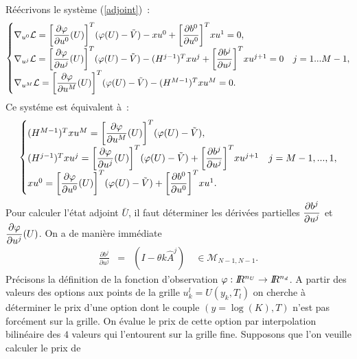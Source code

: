 R\'e\'ecrivons le syst\`eme (\ref{adjoint})~:
\begin{equation*}
\begin{cases}
\nabla_{u^0}\mathcal{L} = \biggl[{\displaystyle\frac{\partial \varphi}
{\partial u^0}(U)}\biggr]^T(\varphi(U)-\tilde{V}) - x{u}^0 + 
\biggl[{\displaystyle\frac{\partial b^0}{\partial u^0}}\biggr]^Tx{u}^1 
= 0,\\
\nabla_{u^j}\mathcal{L} = \biggl[{\displaystyle\frac{\partial \varphi}
{\partial u^j}(U)}\biggr]^T(\varphi(U)-\tilde{V}) - 
(H^{j-1})^Tx{u}^j + \biggl[{\displaystyle\frac{\partial b^j}
{\partial u^j}}\biggr]^Tx{u}^{j+1} = 0 & j=1...M-1,\\
\nabla_{u^M}\mathcal{L} = \biggl[{\displaystyle\frac{\partial \varphi}
{\partial u^M}(U)}\biggr]^T(\varphi(U)-\tilde{V}) - 
(H^{M-1})^Tx{u}^M = 0.
\end{cases}
\end{equation*}
Ce syst\'eme est \'equivalent \`a~: 
\begin{equation}
\begin{cases}
(H^{M-1})^Tx{u}^M = \biggl[{\displaystyle\frac{\partial \varphi}
{\partial u^M}(U)}\biggr]^T(\varphi(U)-\tilde{V}),\\
(H^{j-1})^Tx{u}^j = \biggl[{\displaystyle\frac{\partial \varphi}
{\partial u^j}(U)}\biggr]^T(\varphi(U)-\tilde{V}) + 
\biggl[{\displaystyle\frac{\partial b^j}{\partial u^j}}\biggr]^T
x{u}^{j+1} & j=M-1,...,1,\\
x{u}^0 = \biggl[{\displaystyle\frac{\partial \varphi}
{\partial u^0}(U)}\biggr]^T(\varphi(U)-\tilde{V}) + 
\biggl[{\displaystyle\frac{\partial b^0}{\partial u^0}}\biggr]^Tx{u}^1.
\end{cases}
\end{equation}
Pour calculer l'\'etat adjoint $\bar{U}$, il faut d\'eterminer les 
d\'eriv\'ees partielles ${\displaystyle\frac{\partial b^j}{\partial u^j}}$ 
et ${\displaystyle\frac{\partial \varphi}{\partial u^j}(U)}$. On a de 
mani\`ere imm\'ediate 
\begin{eqnarray*}
\frac{\partial b^j}{\partial u^j} &=& (I-\theta k \hat{A}^j) 
\quad \in \mathcal{M}_{N-1,N-1}.
\end{eqnarray*}
Pr\'ecisons la d\'efinition de la fonction d'observation 
$\varphi : I\!\! R^{n_U} \rightarrow I\!\! R^{n_d}$. A partir des valeurs 
des options aux points de la grille $u^l_k = U(y_k,T_l)$ on cherche 
\`a d\'eterminer le prix d'une option dont le couple $(y=\log(K),T)$ 
n'est pas forc\'ement sur la grille. On \'evalue le prix de cette 
option par interpolation bilin\'eaire des $4$ valeurs qui l'entourent 
sur la grille fine. Supposons que l'on veuille calculer le prix de 
